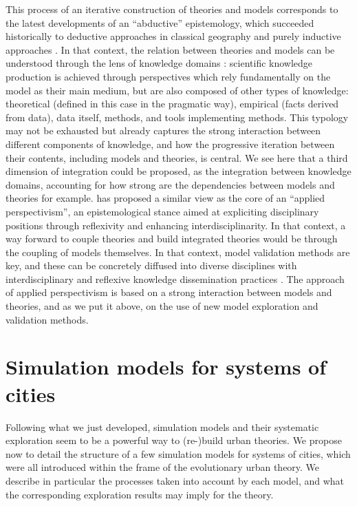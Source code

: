 \documentclass[10pt]{article}
\begin{document}
This process of an iterative construction of theories and models corresponds to the latest developments of an ``abductive'' epistemology, which succeeded historically to deductive approaches in classical geography and purely inductive approaches \citep{varenne2018theories}. In that context, the relation between theories and models can be understood through the lens of knowledge domains \citep{raimbault2017applied}: scientific knowledge production is achieved through perspectives which rely fundamentally on the model as their main medium, but are also composed of other types of knowledge: theoretical (defined in this case in the pragmatic way), empirical (facts derived from data), data itself, methods, and tools implementing methods. This typology may not be exhausted but already captures the strong interaction between different components of knowledge, and how the progressive iteration between their contents, including models and theories, is central. We see here that a third dimension of integration could be proposed, as the integration between knowledge domains, accounting for how strong are the dependencies between models and theories for example. \citep{raimbault2020relating} has proposed a similar view as the core of an ``applied perspectivism'', an epistemological stance aimed at expliciting disciplinary positions through reflexivity and enhancing interdisciplinarity. In that context, a way forward to couple theories and build integrated theories would be through the coupling of models themselves. In that context, model validation methods are key, and these can be concretely diffused into diverse disciplines with interdisciplinary and reflexive knowledge dissemination practices \citep{leclaire2019retour}. The approach of applied perspectivism is based on a strong interaction between models and theories, and as we put it above, on the use of new model exploration and validation methods.


\section{Simulation models for systems of cities}

Following what we just developed, simulation models and their systematic exploration seem to be a powerful way to (re-)build urban theories. We propose now to detail the structure of a few simulation models for systems of cities, which were all introduced within the frame of the evolutionary urban theory. We describe in particular the processes taken into account by each model, and what the corresponding exploration results may imply for the theory.
\end{document}
